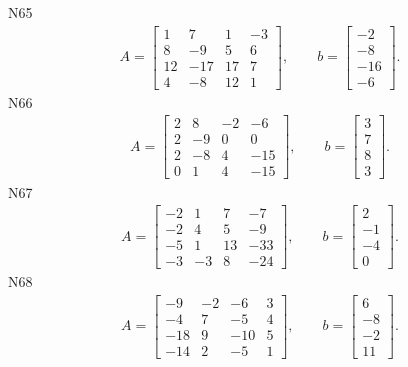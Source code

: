 \documentclass[11pt]{report}
\begin{document}
N65
\begin{align*}
 A = \left[\begin{matrix}1 & 7 & 1 & -3\\8 & -9 & 5 & 6\\12 & -17 & 17 & 7\\4 & -8 & 12 & 1\end{matrix}\right],
\qquad b = \left[\begin{matrix}-2\\-8\\-16\\-6\end{matrix}\right]. 
 \end{align*}
N66
\begin{align*}
 A = \left[\begin{matrix}2 & 8 & -2 & -6\\2 & -9 & 0 & 0\\2 & -8 & 4 & -15\\0 & 1 & 4 & -15\end{matrix}\right],
\qquad b = \left[\begin{matrix}3\\7\\8\\3\end{matrix}\right]. 
 \end{align*}
N67
\begin{align*}
 A = \left[\begin{matrix}-2 & 1 & 7 & -7\\-2 & 4 & 5 & -9\\-5 & 1 & 13 & -33\\-3 & -3 & 8 & -24\end{matrix}\right],
\qquad b = \left[\begin{matrix}2\\-1\\-4\\0\end{matrix}\right]. 
 \end{align*}
N68
\begin{align*}
 A = \left[\begin{matrix}-9 & -2 & -6 & 3\\-4 & 7 & -5 & 4\\-18 & 9 & -10 & 5\\-14 & 2 & -5 & 1\end{matrix}\right],
\qquad b = \left[\begin{matrix}6\\-8\\-2\\11\end{matrix}\right]. 
 \end{align*}
\end{document}
